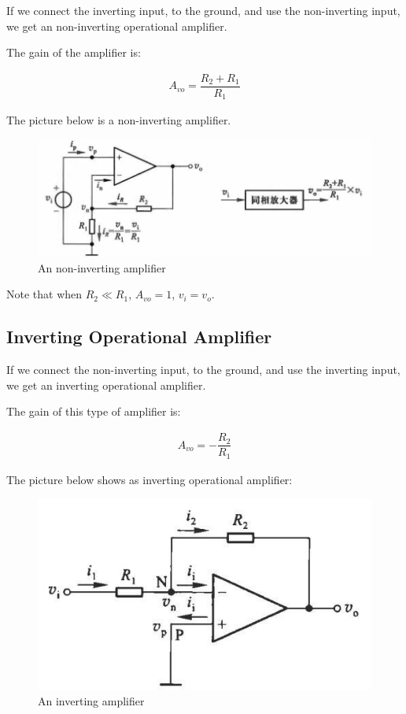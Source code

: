 If we connect the inverting input, to the ground, and use the non-inverting input, we get an non-inverting operational amplifier.

The gain of the amplifier is:

\begin{equation*}
  \begin{aligned}
    A_{vo} = \dfrac{R_2 + R_1}{R_1} 
  \end{aligned}
\end{equation*}

The picture below is a non-inverting amplifier.

\begin{figure}[H]
  \centering
  \includegraphics[width=0.9\linewidth]{figures/non-inverting-amplifier}
  \caption{An non-inverting amplifier}
  \label{fig:}
\end{figure}

Note that when $R_2\ll R_1$, $A_{vo} = 1$, $v_i = v_o$.

\subsection{Inverting Operational Amplifier}

If we connect the non-inverting input, to the ground, and use the inverting input, we get an inverting operational amplifier.

The gain of this type of amplifier is:

\begin{equation*}
  \begin{aligned}
    A_{vo} = - \dfrac{R_2}{R_1} 
  \end{aligned}
\end{equation*}

The picture below shows as inverting operational amplifier:

\begin{figure}[H]
  \centering
  \includegraphics[width=0.5\linewidth]{figures/inverting-amplifier}
  \caption{An inverting amplifier}
  \label{fig:}
\end{figure}

